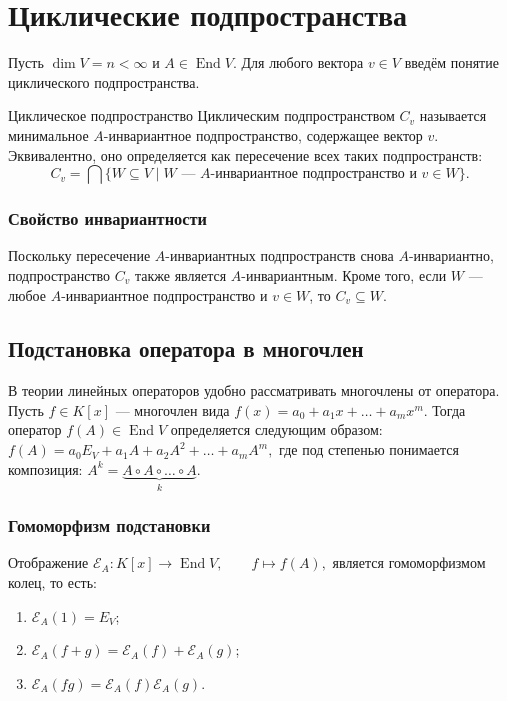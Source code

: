 
\section{Циклические подпространства}

Пусть $\dim V = n < \infty$ и $A \in \operatorname{End} V$. Для любого вектора $v \in V$ введём понятие циклического подпространства.

\begin{Definition}{Циклическое подпространство}{}
	Циклическим подпространством $C_v$ называется минимальное $A$-инвариантное подпространство, содержащее вектор $v$. Эквивалентно, оно определяется как пересечение всех таких подпространств:
	\[
	C_v = \bigcap\{W \subseteq V \mid W \text{ — $A$-инвариантное подпространство и } v \in W\}.
	\]
\end{Definition}

\subsubsection*{Свойство инвариантности}

Поскольку пересечение $A$-инвариантных подпространств снова $A$-инвариантно, подпространство $C_v$ также является $A$-инвариантным. Кроме того, если $W$ — любое $A$-инвариантное подпространство и $v \in W$, то $C_v \subseteq W$.

\subsection{Подстановка оператора в многочлен}

В теории линейных операторов удобно рассматривать многочлены от оператора. Пусть $f \in K[x]$ — многочлен вида $f(x) = a_0 + a_1x + \dots + a_mx^m.$
Тогда оператор $f(A) \in \operatorname{End} V$ определяется следующим образом: $f(A) = a_0 E_V + a_1 A + a_2 A^2 + \dots + a_m A^m,$
где под степенью понимается композиция: $A^k = \underbrace{A \circ A \circ \dots \circ A}_{k}.$

\subsubsection*{Гомоморфизм подстановки}

Отображение $\mathcal{E}_A \colon K[x] \to \operatorname{End} V, \qquad f \mapsto f(A),$
является гомоморфизмом колец, то есть:
\begin{enumerate}
	\item $\mathcal{E}_A(1) = E_V$;
	\item $\mathcal{E}_A(f + g) = \mathcal{E}_A(f) + \mathcal{E}_A(g)$;
	\item $\mathcal{E}_A(fg) = \mathcal{E}_A(f)\mathcal{E}_A(g)$.
\end{enumerate}

